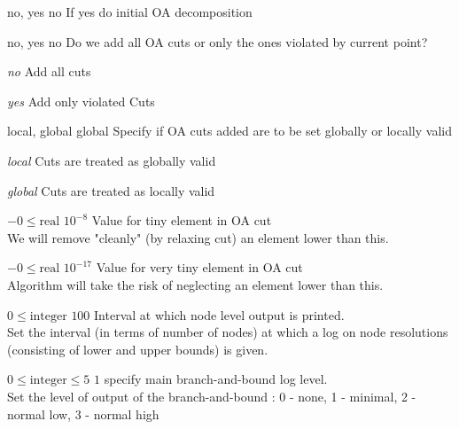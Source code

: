 %
{no, yes}%
{no}%
{If yes do initial OA decomposition}%
{}

%
{no, yes}%
{no}%
{Do we add all OA cuts or only the ones violated by current point?}%
{\begin{list}{}{
\setlength{\parsep}{0em}
\setlength{\leftmargin}{3ex}
\setlength{\labelwidth}{1ex}
\setlength{\itemindent}{0ex}
\setlength{\topsep}{0pt}}
\item[\textit{no}] Add all cuts
\item[\textit{yes}] Add only violated Cuts
\end{list}
}

%
{local, global}%
{global}%
{Specify if OA cuts added are to be set globally or locally valid}%
{\begin{list}{}{
\setlength{\parsep}{0em}
\setlength{\leftmargin}{3ex}
\setlength{\labelwidth}{1ex}
\setlength{\itemindent}{0ex}
\setlength{\topsep}{0pt}}
\item[\textit{local}] Cuts are treated as globally valid
\item[\textit{global}] Cuts are treated as locally valid
\end{list}
}

%
{$-0\leq\textrm{real}$}%
{$10^{- 8}$}%
{Value for tiny element in OA cut\\
We will remove "cleanly" (by relaxing cut) an element lower than this.}%
{}

%
{$-0\leq\textrm{real}$}%
{$10^{-17}$}%
{Value for very tiny element in OA cut\\
Algorithm will take the risk of neglecting an element lower than this.}%
{}

%
{$0\leq\textrm{integer}$}%
{$100$}%
{Interval at which node level output is printed.\\
Set the interval (in terms of number of nodes) at which a log on node resolutions (consisting of lower and upper bounds) is given.}%
{}

%
{$0\leq\textrm{integer}\leq5$}%
{$1$}%
{specify main branch-and-bound log level.\\
Set the level of output of the branch-and-bound : 0 - none, 1 - minimal, 2 - normal low, 3 - normal high}%
{}

